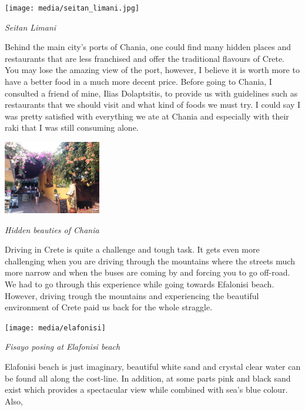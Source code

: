 \documentclass[10pt,a4paper]{article} %
\begin{document}
\begin{multicols}{3}
 
\begin{center}
	\texttt{[image: media/seitan\_limani.jpg]}
	\par\textit{Seitan Limani}
\end{center}



Behind the main city's ports of Chania, one could find many hidden places and 
restaurants that are less franchised and offer the traditional flavours of 
Crete. 
You may lose the amazing view of the port, however, I believe it is worth more 
to have a better food in a much more decent price. 
Before going to Chania, I consulted a friend of mine, Ilias Dolaptsitis, 
to provide us with guidelines such as restaurants that we should visit and what 
kind of foods we must try. 
I could say I was pretty satisfied with everything we ate at Chania and especially 
with their raki that I was still consuming alone. 


\begin{center}
	\includegraphics[width=0.32\textwidth]{media/chania_2.jpg}
	\par\textit{Hidden beauties of Chania}
\end{center}


Driving in Crete is quite a challenge and tough task. 
It gets even more challenging when you are driving through the mountains 
where the streets much more narrow and when the buses are coming by and 
forcing you to go off-road. 
We had to go through this experience while going towards Efalonisi beach. 
However, driving trough the mountains and experiencing the beautiful environment 
of Crete paid us back for the whole straggle.


\begin{center}
	\texttt{[image: media/elafonisi]}
	\par\textit{Fisayo posing at Elafonisi beach}
\end{center}


Elafonisi beach is just imaginary, beautiful white sand and crystal clear water 
can be found all along the cost-line. 
In addition, at some parts pink and black sand exist which provides a spectacular 
view while combined with sea's blue colour. 
Also, 



\end{multicols}
\end{document}
